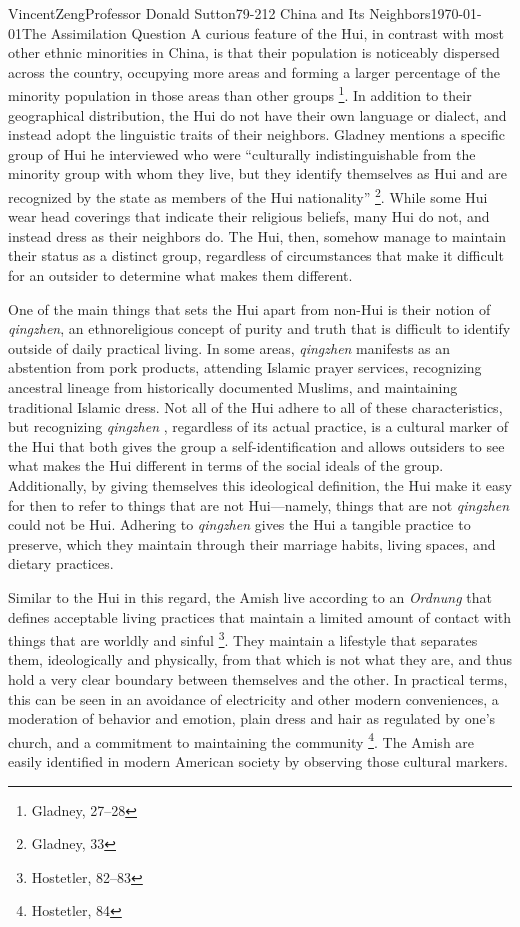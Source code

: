 \documentclass{article}[12pt]
\begin{document}
\begin{mla}{Vincent}{Zeng}{Professor Donald Sutton}{79-212 China and Its Neighbors}{\today}{The Assimilation Question}
A curious feature of the Hui, in contrast with most other ethnic minorities in
China, is that their population is noticeably dispersed across the country,
occupying more areas and forming a larger percentage of the minority population
in those areas than other groups \footnote{Gladney, 27--28}. In addition to
their geographical distribution, the Hui do not have their own language or
dialect, and instead adopt the linguistic traits of their neighbors. Gladney
mentions a specific group of Hui he interviewed who were ``culturally
indistinguishable from the minority group with whom they live, but they
identify themselves as Hui and are recognized by the state as members of the
Hui nationality'' \footnote{Gladney, 33}. While some Hui wear head coverings
that indicate their religious beliefs, many Hui do not, and instead dress as
their neighbors do. The Hui, then, somehow manage to maintain their status as a
distinct group, regardless of circumstances that
make it difficult for an outsider to determine what makes them different.

One of the main things that sets the Hui apart from non-Hui is their notion of
\textit{qingzhen}, an ethnoreligious concept of purity and truth that is
difficult to identify outside of daily practical living. In some areas,
\textit{qingzhen} manifests as an abstention from pork products, attending
Islamic prayer services, recognizing ancestral lineage from historically
documented Muslims, and maintaining traditional Islamic dress. Not all of the
Hui adhere to all of these characteristics, but recognizing \textit{qingzhen}
, regardless of its actual practice, is a cultural marker of the Hui that both
gives the group a self-identification and allows outsiders to see what makes the Hui different in terms of
 the social ideals of the group. Additionally, by giving themselves this
ideological definition, the Hui make it easy for then to refer to things that
are not Hui---namely, things that are not \textit{qingzhen} could not be Hui.
Adhering to \textit{qingzhen} gives the Hui a tangible practice to preserve,
which they maintain through their marriage habits, living spaces, and dietary
practices.

Similar to the Hui in this regard, the Amish live according to an
\textit{Ordnung} that defines acceptable living practices that maintain a
limited amount of contact with things that are worldly and sinful
\footnote{Hostetler, 82--83}. They maintain a lifestyle that separates them,
ideologically and physically, from that which is not what they are, and thus
hold a very clear boundary between themselves and the other. In practical
terms, this can be seen in an avoidance of electricity and other modern
conveniences, a moderation of behavior and emotion, plain dress and hair as
regulated by one's church, and a commitment to maintaining the community
\footnote{Hostetler, 84}. The Amish are easily identified in modern American
society by observing those cultural markers.


\end{mla}
\end{document}
